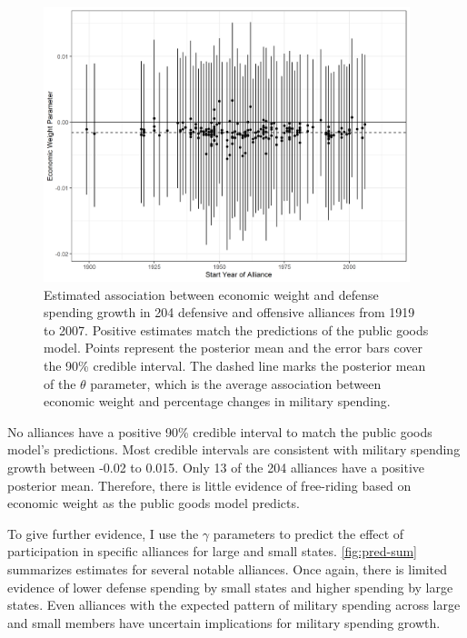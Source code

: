 \documentclass[12pt]{article}
\begin{document}
\begin{figure}[htbp]
	\centering
		\includegraphics[width=0.95\textwidth]{alliance-coefs-year.png}
	\caption{Estimated association between economic weight and defense spending growth in 204 defensive and offensive alliances from 1919 to 2007. Positive estimates match the predictions of the public goods model. Points represent the posterior mean and the error bars cover the 90\% credible interval. The dashed line marks the posterior mean of the $\theta$ parameter, which is the average association between economic weight and percentage changes in military spending.}
	\label{fig:alliance-coefs-year}
\end{figure}


No alliances have a positive 90\% credible interval to match the public goods model's predictions. 
Most credible intervals are consistent with military spending growth between -0.02 to 0.015. 
Only 13 of the 204 alliances have a positive posterior mean. 
Therefore, there is little evidence of free-riding based on economic weight as the public goods model predicts. 


To give further evidence, I use the $\gamma$ parameters to predict the effect of participation in specific alliances for large and small states.
\autoref{fig:pred-sum} summarizes estimates for several notable alliances. 
Once again, there is limited evidence of lower defense spending by small states and higher spending by large states. 
Even alliances with the expected pattern of military spending across large and small members have uncertain implications for military spending growth.  
\end{document}
